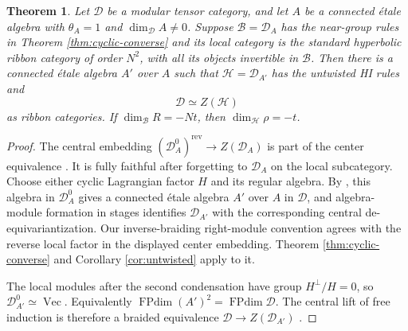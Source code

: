 \documentclass[11pt,a4paper]{article}
\numberwithin{equation}{section}
\newtheorem{theorem}{Theorem}[section]
\theoremstyle{definition}\newtheorem{definition}[theorem]{Definition}
\theoremstyle{remark}\newtheorem{remark}[theorem]{Remark}
\begin{document}
\begin{theorem}\label{thm:ribbon-center}
Let $\mathcal D$ be a modular tensor category, and let $A$ be a
connected \'etale algebra with $\theta_A=1$ and
$\dim_{\mathcal D}A\ne0$. Suppose
$\mathcal B=\mathcal D_A$ has the near-group rules in
Theorem \ref{thm:cyclic-converse} and its local category is the
standard hyperbolic ribbon category of order $N^2$, with all its
objects invertible in $\mathcal B$.
Then there is a connected \'etale algebra $A'$ over $A$ such that
$\mathcal H=\mathcal D_{A'}$ has the untwisted HI rules and
\[
                  \mathcal D\simeq Z(\mathcal H)
\]
as ribbon categories. If $\dim_{\mathcal B}R=-Nt$, then
$\dim_{\mathcal H}\rho=-t$.
\end{theorem}
\begin{proof}
The central embedding
$(\mathcal D_A^0)^{\mathrm{rev}}\to Z(\mathcal D_A)$ is part of
the center equivalence \cite[Corollary 3.30]{dmno}.
It is fully faithful after forgetting to $\mathcal D_A$ on the local
subcategory. Choose either cyclic Lagrangian factor $H$ and its
regular algebra. By \cite[Section 3.6 and Proposition 3.16]{dmno},
this algebra in $\mathcal D_A^0$ gives a connected \'etale algebra
$A'$ over $A$ in $\mathcal D$, and algebra-module formation in
stages identifies $\mathcal D_{A'}$ with the corresponding central
de-equivariantization. Our inverse-braiding right-module convention
agrees with the reverse local factor in the displayed center embedding.
Theorem \ref{thm:cyclic-converse} and Corollary \ref{cor:untwisted}
apply to it.

The local modules after the second condensation have group
$H^\perp/H=0$, so $\mathcal D_{A'}^0\simeq\operatorname{Vec}$.
Equivalently $\operatorname{FPdim}(A')^2=\operatorname{FPdim}\mathcal D$.
The central lift of free induction is therefore a braided equivalence
$\mathcal D\to Z(\mathcal D_{A'})$
\cite[Corollary 4.1]{dmno}.


\end{proof}
\end{document}
